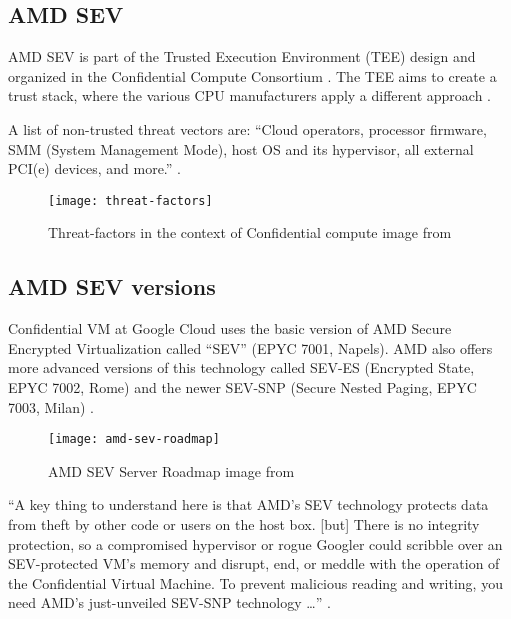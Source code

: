 \subsection*{AMD SEV}
AMD SEV is part of the Trusted Execution Environment (TEE) design 
and organized in the Confidential Compute Consortium 
\citep{foundation_members_2020}. 
The TEE aims to create a trust stack, 
where the various CPU manufacturers apply a different approach 
\citep{eckert_kick-off_2020,kohlbrenner_building_2020}. 

A list of non-trusted threat vectors are: 
“Cloud operators, processor firmware, SMM (System Management Mode), 
host OS and its hypervisor, all external PCI(e) devices, and more.” 
\citep{chamarthy_challenges_2020}.

\begin{figure}[!ht]
    \centering
    \texttt{[image: threat-factors]}
    \caption{Threat-factors in the context of Confidential compute 
    image from \cite{kohlbrenner_building_2020}}
    \label{fig:threat-factors}
\end{figure}


\subsection*{AMD SEV versions}
Confidential VM at Google Cloud uses the basic version of 
AMD Secure Encrypted Virtualization called “SEV” (EPYC 7001, Napels). 
AMD also offers more advanced versions of this technology called 
SEV-ES (Encrypted State, EPYC 7002, Rome) 
and the newer SEV-SNP (Secure Nested Paging, EPYC 7003, Milan)
\citep{cutress_amd_2021,wikichip_contributors_epyc_2021,kennedy_google_2020}.

\begin{figure}[!ht]
    \centering
    \texttt{[image: amd-sev-roadmap]}
    \caption{AMD SEV Server Roadmap image from \cite{razavidinani_amd_2021}}
    \label{fig:amd-sev-roadmap}
\end{figure}


“A key thing to understand here is that AMD's SEV technology 
protects data from theft by other code or users on the host box. 
[but]
There is no integrity protection, 
so a compromised hypervisor or rogue Googler could scribble over 
an SEV-protected VM's memory and disrupt, end, or meddle 
with the operation of the Confidential Virtual Machine. 
To prevent malicious reading and writing, 
you need AMD's just-unveiled SEV-SNP technology …” 
\citep{nichols_match_2020,mms_securing_2015}.

